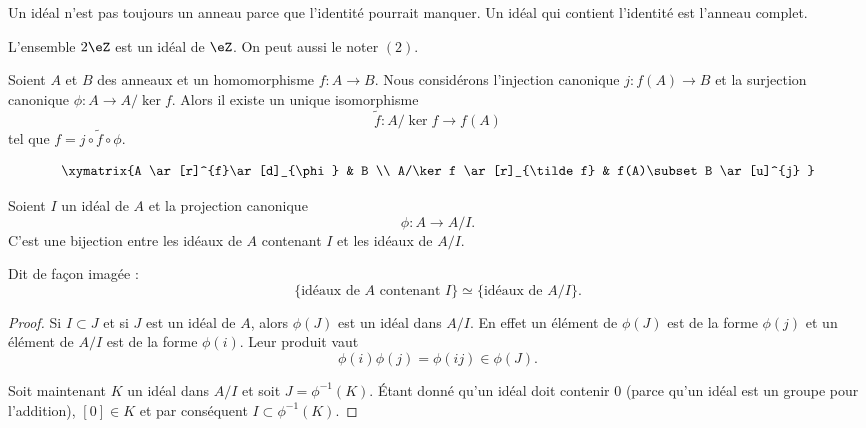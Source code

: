 \begin{remark}
	Un idéal n'est pas toujours un anneau parce que l'identité pourrait manquer. Un idéal qui contient l'identité est l'anneau complet.
\end{remark}

\begin{lemma}       \label{LEMooQAYSooCYJXkC}
	L'ensemble \( 2\eZ\) est un idéal de \( \eZ\). On peut aussi le noter \( (2) \).
\end{lemma}

\begin{proposition}   \label{PROPooJALPooHFIObB}
	Soient \( A\) et \( B\) des anneaux et un homomorphisme \( f\colon A\to B\). Nous considérons l'injection canonique \( j\colon f(A)\to B\) et la surjection canonique \( \phi\colon A\to A/\ker f\). Alors il existe un unique isomorphisme
	\begin{equation}
		\tilde f \colon A/\ker f\to f(A)
	\end{equation}
	tel que \( f=j\circ\tilde f\circ\phi\).

	\begin{equation}
		\xymatrix{%
			A \ar[r]^{f}\ar[d]_{\phi}       &   B                         \\
			A/\ker f    \ar[r]_{\tilde f}   &   f(A)\subset B \ar[u]^{j}
		}
	\end{equation}
\end{proposition}

\begin{proposition}     \label{PropIJJIdsousphi}
	Soient \( I\) un idéal de \( A\) et la projection canonique
	\begin{equation}
		\phi\colon A\to A/I.
	\end{equation}
	C'est une bijection entre les idéaux de \( A\) contenant \( I\) et les idéaux de \( A/I\).

	Dit de façon imagée :
	\begin{equation}        \label{EqKbrizu}
		\{ \text{idéaux de } A\text{ contenant } I\}\simeq\{ \text{idéaux de } A/I \}.
	\end{equation}
\end{proposition}

\begin{proof}
	Si \( I\subset J\) et si \( J \) est un idéal de \( A\), alors \( \phi(J)\) est un idéal dans \( A/I\). En effet un élément de \( \phi(J)\) est de la forme \( \phi(j)\) et un élément de \( A/I\) est de la forme \( \phi(i)\). Leur produit vaut
	\begin{equation}
		\phi(i)\phi(j)=\phi(ij)\in\phi(J).
	\end{equation}

	Soit maintenant \( K\) un idéal dans \( A/I\) et soit \( J=\phi^{-1}(K)\). Étant donné qu'un idéal doit contenir \( 0\) (parce qu'un idéal est un groupe pour l'addition), \( [0]\in K\) et par conséquent \( I\subset\phi^{-1}(K)\).
\end{proof}

